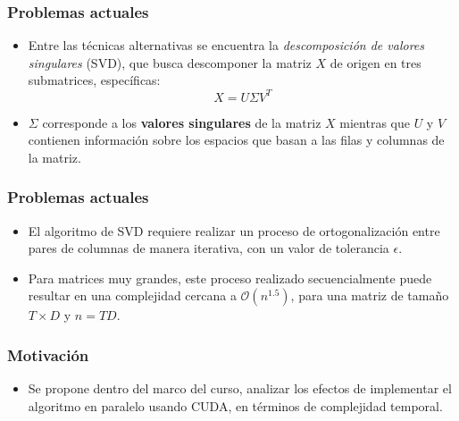 \begin{frame}
\frametitle{Problemas actuales}
\begin{itemize}
    \item Entre las técnicas alternativas se encuentra la \textit{descomposición de valores singulares} (SVD), que busca descomponer la matriz $X$ de origen en tres submatrices, específicas:
    \begin{equation}
        X = U\Sigma V^T
    \end{equation}
    \item $\Sigma$ corresponde a los \textbf{valores singulares} de la matriz $X$ mientras que $U$ y $V$ contienen información sobre los espacios que basan a las filas y columnas de la matriz.
\end{itemize}
\end{frame}

\begin{frame}
\frametitle{Problemas actuales}
\begin{itemize}
    \item El algoritmo de SVD requiere realizar un proceso de ortogonalización entre pares de columnas de manera iterativa, con un valor de tolerancia $\epsilon$.
    \item Para matrices muy grandes, este proceso realizado secuencialmente puede resultar en una complejidad cercana a $\mathcal{O}(n^{1.5})$, para una matriz de tamaño $T \times D$ y $n = TD$.
\end{itemize}    
\end{frame}

\begin{frame}
\frametitle{Motivación}
\begin{itemize}
    \item Se propone dentro del marco del curso, analizar los efectos de implementar el algoritmo en paralelo usando CUDA, en términos de complejidad temporal.
\end{itemize}
\end{frame}
